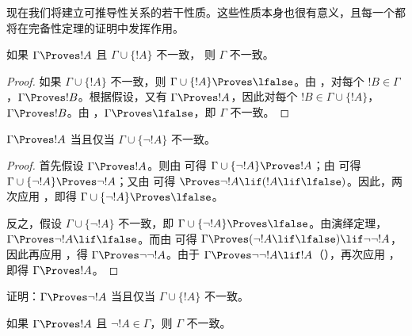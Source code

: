 \documentclass[../../../include/open-logic-section]{subfiles}
\begin{document}
      {}
      {}


现在我们将建立可推导性关系的若干性质。这些性质本身也很有意义，且每一个都将在完备性定理的证明中发挥作用。

\begin{prop}
  如果 $\Gamma \Proves !A$ 且 $\Gamma \cup \{!A\}$ 不一致，
  则 $\Gamma$ 不一致。
\end{prop}

\begin{proof}
  如果 $\Gamma \cup \{!A\}$ 不一致，则 $\Gamma \cup \{!A\}
  \Proves \lfalse$。由 ，对每个 $!B \in \Gamma$，$\Gamma \Proves
  !B$。根据假设，又有 $\Gamma \Proves !A$，因此对每个 $!B \in \Gamma \cup
  \{!A\}$，$\Gamma \Proves !B$。由 ，$\Gamma \Proves
  \lfalse$，即 $\Gamma$ 不一致。
\end{proof}

\begin{prop}
$\Gamma \Proves !A$ 当且仅当 $\Gamma \cup \{\lnot !A\}$ 不一致。
\end{prop}

\begin{proof}
首先假设 $\Gamma \Proves !A$。则由  可得 $\Gamma \cup \{\lnot !A\}
\Proves !A$；由  可得 $\Gamma \cup \{\lnot
!A\} \Proves \lnot !A$；又由  可得 $\Proves \lnot !A \lif (!A \lif \lfalse)$。因此，两次应用 ，即得 $\Gamma \cup \{\lnot
!A\} \Proves \lfalse$。

反之，假设 $\Gamma \cup \{\lnot !A\}$ 不一致，即 $\Gamma
\cup \{\lnot !A\} \Proves \lfalse$。由演绎定理，$\Gamma
\Proves \lnot !A \lif \lfalse$。而由  可得 $\Gamma \Proves (\lnot !A \lif
\lfalse) \lif \lnot\lnot !A$，因此再应用 ，得 $\Gamma \Proves \lnot\lnot !A$。由于 $\Gamma \Proves
\lnot\lnot !A \lif !A$（），再次应用 ，即得 $\Gamma
\Proves !A$。
\end{proof}

\begin{prob}
证明：$\Gamma \Proves \lnot !A$ 当且仅当 $\Gamma \cup \{!A\}$ 不一致。
\end{prob}

\begin{prop}
  如果 $\Gamma \Proves !A$ 且 $\lnot !A \in \Gamma$，则 $\Gamma$ 不一致。
\end{prop}
\end{document}
